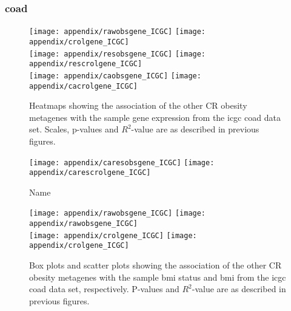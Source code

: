 \begin{appendices}
	\subsubsection{\gls{coad}}
	\label{ssub:coad}
	
	\begin{figure}[htp!]
		\centering
		\texttt{[image: appendix/rawobsgene\_ICGC]}
		\hfill
		\texttt{[image: appendix/crolgene\_ICGC]}\\
		\texttt{[image: appendix/resobsgene\_ICGC]}
		\hfill
		\texttt{[image: appendix/rescrolgene\_ICGC]}\\
		\texttt{[image: appendix/caobsgene\_ICGC]}
		\hfill
		\texttt{[image: appendix/cacrolgene\_ICGC]}\\
		\caption{Heatmaps showing the association of the other CR obesity metagenes with the sample gene expression from the \gls{icgc} \gls{coad} data set.
		Scales, p-values and $R^2$-value are as described in previous figures.}
		\label{fig:degmetaicgc_coad}
	\end{figure}

	\begin{figure}[htpb]
		\ContinuedFloat
		\captionsetup{list=off,format=cont}
		\centering
		\texttt{[image: appendix/caresobsgene\_ICGC]}
		\hfill
		\texttt{[image: appendix/carescrolgene\_ICGC]}\\
		\caption{Name}
	\end{figure}

	\begin{figure}[!htpb]
		\centering
		\texttt{[image: appendix/rawobsgene\_ICGC]}
		\hfill
		\texttt{[image: appendix/rawobsgene\_ICGC]}\\
		\texttt{[image: appendix/crolgene\_ICGC]}
		\hfill
		\texttt{[image: appendix/crolgene\_ICGC]}\\
		\caption{Box plots and scatter plots showing the association of the other CR obesity metagenes with the sample \gls{bmi} status  and \gls{bmi} from the \gls{icgc} \gls{coad} data set, respectively.
	P-values and $R^2$-value are as described in previous figures.}
		\label{fig:appendix/cr_ob_meta_box_scatter_coad}
	\end{figure}


\end{appendices}
